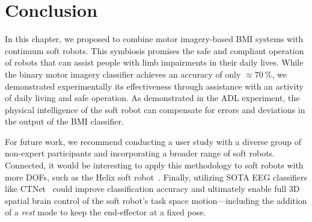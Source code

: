 \section{Conclusion}
In this chapter, we proposed to combine motor imagery-based \gls{BMI} systems with continuum soft robots. This symbiosis promises the safe and compliant operation of robots that can assist people with limb impairments in their daily lives.
While the binary motor imagery classifier achieves an accuracy of only $\approx \SI{70}{\percent}$, we demonstrated experimentally its effectiveness through assistance with an activity of daily living and safe operation.
As demonstrated in the \gls{ADL} experiment, the physical intelligence of the soft robot can compensate for errors and deviations in the output of the \gls{BMI} classifier.

For future work, we recommend conducting a user study with a diverse group of non-expert participants and incorporating a broader range of soft robots. Connected, it would be interesting to apply this methodology to soft robots with more \glspl{DOF}, such as the Helix soft robot~\citep{guan2023trimmed}. Finally, utilizing \gls{SOTA} \gls{EEG} classifiers like CTNet~\citep{zhao2024ctnet} could improve classification accuracy and ultimately enable full 3D spatial brain control of the soft robot’s task space motion—including the addition of a \emph{rest} mode to keep the end-effector at a fixed pose.